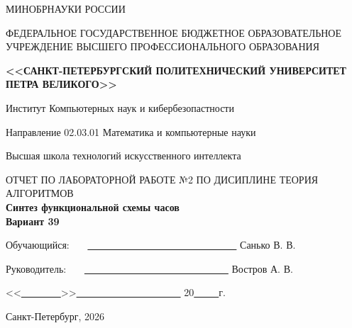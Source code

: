 \documentclass[11pt,a4paper,final]{article}
\begin{document}
	\begin{center}
		{\large МИНОБРНАУКИ РОССИИ}
		\par
		\vspace{8pt}
		{\large ФЕДЕРАЛЬНОЕ ГОСУДАРСТВЕННОЕ БЮДЖЕТНОЕ ОБРАЗОВАТЕЛЬНОЕ УЧРЕЖДЕНИЕ}
		\vspace{7pt} 
		{\large ВЫСШЕГО ПРОФЕССИОНАЛЬНОГО ОБРАЗОВАНИЯ}
		
		\vspace{3pt} 
		{\Large \bf <<САНКТ-ПЕТЕРБУРГСКИЙ ПОЛИТЕХНИЧЕСКИЙ УНИВЕРСИТЕТ ПЕТРА ВЕЛИКОГО>>}
		
		\vspace{1pt}
		{\Large Институт Компьютерных наук и кибербезопастности}
		
		\vspace{1pt} 
		{\Large Направление 02.03.01 Математика и компьютерные науки}
		
		\vspace{1pt} 
		{\Large Высшая школа технологий искусственного интеллекта}
		
		\vspace{75pt} 
		{\large ОТЧЕТ ПО ЛАБОРАТОРНОЙ РАБОТЕ №2 ПО ДИСИПЛИНЕ ТЕОРИЯ АЛГОРИТМОВ}
		{\large }\\
		
		\vspace{10pt}
		{\Huge \bf Синтез функциональной схемы часов} \\
		\vspace{10pt}
		{\Huge \bf Вариант 39}
	\end{center}
	
	\vspace{110pt} 
	\hspace{1cm}
	{\large Обучающийся: \ \ \ \underline{\ \ \ \ \ \ \ \ \ \ \ \ \ \ \ \ \ \ \ \ \ \ \ \ \ \ \ \ \ \ }
		\hspace {2cm} Санько В. В.} 
	
	\vspace{10pt} 
	\hspace{1cm}
	{\large Руководитель: \ \ \ \underline{\ \ \ \ \ \ \ \ \ \ \ \ \ \ \ \ \ \ \ \ \ \ \ \ \ \ \ \ \ } 
		\hspace {2.25cm} Востров А. В.}
	
	\vspace{40pt} 
	\begin{flushright}
		{<<\underline{\ \ \ \ \ \ \ \ }>>\underline{\ \ \ \ \ \ \ \ \ \ \ \ \ \ \ \ \ \ \ \ \ }
			20\underline{\ \ \ \ \ }г.}
	\end{flushright}
	
	\vspace{80pt} 
	\begin{center}
		{\large Санкт-Петербург, 2026}
	\end{center}
	\thispagestyle{empty}
	
\end{document}
